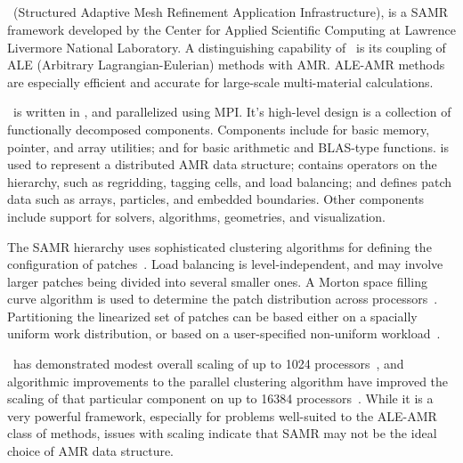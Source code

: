 \documentclass[10pt,twocolumn]{article}
\begin{document}
\subsection{\samrai} \label{ss:samrai}

\samrai\ (Structured Adaptive Mesh Refinement Application
Infrastructure), is a SAMR framework developed by the Center for
Applied Scientific Computing at Lawrence Livermore National
Laboratory.  A distinguishing capability of \samrai\ is its coupling
of ALE (Arbitrary Lagrangian-Eulerian) methods with AMR.  ALE-AMR
methods are especially efficient and accurate for large-scale
multi-material calculations.

\samrai\ is written in \cpp, and parallelized using MPI.  It's
high-level design is a collection of functionally decomposed
components.  Components include  for basic memory,
pointer, and array utilities; and  for basic
arithmetic and BLAS-type functions.   is used to
represent a distributed AMR data structure;  contains
operators on the hierarchy, such as regridding, tagging cells, and
load balancing; and  defines patch data such as
arrays, particles, and embedded boundaries.  Other components include
support for solvers, algorithms, geometries,  and visualization.

The SAMR hierarchy uses sophisticated clustering algorithms for
defining the configuration of patches~\cite{GuWi06}.  Load balancing
is level-independent, and may involve larger patches being divided
into several smaller ones.  A Morton space filling curve algorithm is
used to determine the patch distribution across
processors~\cite{WiHo01}.  Partitioning the linearized set of patches
can be based either on a spacially uniform work distribution, or based
on a user-specified non-uniform workload~\cite{wwwsamraicode}.

\samrai\ has demonstrated modest overall scaling of up to 1024
processors~\cite{WiHy03}, and algorithmic improvements to the parallel
clustering algorithm have improved the scaling of that particular
component on up to 16384 processors~\cite{GuWi06}.  While it is a very
powerful framework, especially for problems well-suited to the ALE-AMR
class of methods, issues with scaling indicate that SAMR may not be the
ideal choice of AMR data structure.

\end{document}
